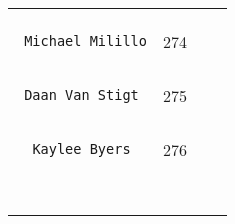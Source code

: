\documentclass[]{article}
\begin{document}
\begin{longtable}[c]{@{}llll@{}}
\begin{minipage}[t]{0.15\columnwidth}
\end{minipage}
\\\noalign{\medskip}
\begin{minipage}[t]{0.39\columnwidth}\raggedright
\begin{verbatim}
 Michael Milillo
\end{verbatim}
\end{minipage} & \begin{minipage}[t]{0.10\columnwidth}\raggedright
274
\end{minipage} & \begin{minipage}[t]{0.13\columnwidth}\raggedright
\end{minipage} & \begin{minipage}[t]{0.15\columnwidth}\raggedright
\end{minipage}
\\\noalign{\medskip}
\begin{minipage}[t]{0.39\columnwidth}\raggedright
\begin{verbatim}
 Daan Van Stigt
\end{verbatim}
\end{minipage} & \begin{minipage}[t]{0.10\columnwidth}\raggedright
275
\end{minipage} & \begin{minipage}[t]{0.13\columnwidth}\raggedright
\end{minipage} & \begin{minipage}[t]{0.15\columnwidth}\raggedright
\end{minipage}
\\\noalign{\medskip}
\begin{minipage}[t]{0.39\columnwidth}\raggedright
\begin{verbatim}
  Kaylee Byers
\end{verbatim}
\end{minipage} & \begin{minipage}[t]{0.10\columnwidth}\raggedright
276
\end{minipage} & \begin{minipage}[t]{0.13\columnwidth}\raggedright
\end{minipage} & \begin{minipage}[t]{0.15\columnwidth}\raggedright
\end{minipage}
\\\noalign{\medskip}
\begin{minipage}[t]{0.39\columnwidth}\raggedright
\begin{verbatim}

\end{verbatim}
\end{minipage}
\end{longtable}
\end{document}
